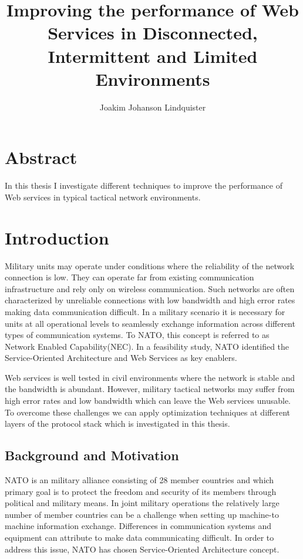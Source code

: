 \documentclass[USenglish]{ifimaster}
\title{Improving the performance of Web Services in Disconnected, Intermittent and Limited Environments}
\author{Joakim Johanson Lindquister}
\begin{document}
\ififorside{}

\chapter*{Abstract}
In this thesis I investigate different techniques to improve the performance of Web services in typical tactical network environments.
\pagebreak

\tableofcontents
\listoftables
\listoffigures

\pagebreak


\chapter{Introduction}
Military units may operate under conditions where the reliability of the network connection is low. They can operate far from existing communication infrastructure and rely only on wireless communication. Such networks are often characterized by unreliable connections with low bandwidth and high error rates making data communication difficult. In a military scenario it is necessary for units at all operational levels to seamlessly exchange information across different types of communication systems. To NATO, this concept is referred to as Network Enabled Capability(NEC). In a feasibility study, NATO identified the Service-Oriented Architecture and Web Services as key enablers\cite{nnec-study}.

Web services is well tested in civil environments where the network is stable and the bandwidth is abundant. However, military tactical networks may suffer from high error rates and low bandwidth which can leave the Web services unusable. To overcome these challenges we can apply optimization techniques at different layers of the protocol stack which is investigated in this thesis.


\section{Background and Motivation}
NATO is an military alliance consisting of 28 member countries\cite{nato-homepage-member-countries} and which primary goal is to protect the freedom and security of its members through political and military means. In joint military operations the relatively large number of member countries can be a challenge when setting up machine-to machine information exchange. Differences in communication systems and equipment can attribute to make data communicating difficult. In order to address this issue, NATO has chosen Service-Oriented Architecture concept.
\end{document}
